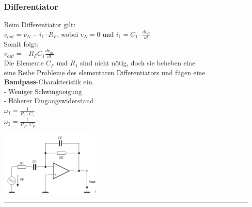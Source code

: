    
		\begin{minipage}[c]{12cm}        
        \subsubsection{Differentiator}
           	Beim Differentiator gilt: \\ 
           	$v_{out}=v_N-i_1 \cdot R_F$, wobei $v_N=0$ und $i_1=C_1 \cdot \frac{dv_C}{dt}$\\
           	Somit folgt:\\
           	$v_{out}=-R_FC_1 \frac{dv_{in}}{dt}$\\
           		
           	Die Elemente $C_F$ und $R_1$ sind nicht nötig, doch sie beheben eine\\
           	eine Reihe Probleme des elementaren Differentiators und fügen eine \\
           	{\bf Bandpass}-Charakteristik ein. \\
           	- Weniger Schwingneigung \\
           	- Höherer Eingangswiderstand \\
           	$\omega_1 = \frac{1}{R_1 \cdot C_1}$\\
           	$\omega_2 = \frac{1}{R_F \cdot C_F}$\\      
        \end{minipage}
		\begin{minipage}[c]{5cm}
        	\includegraphics[width=5cm]{./images/differentiator.png}
        \end{minipage}
\hrule

